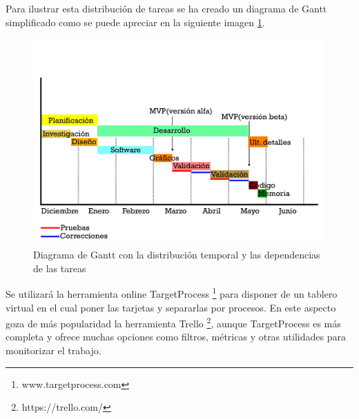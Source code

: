 Para ilustrar esta distribución de tareas se ha creado un diagrama de Gantt simplificado como se puede apreciar en la siguiente imagen \ref{gantt01}.

\begin{figure}
	\begin{center}
		\includegraphics[scale=0.6]{imagenes/GanttDiagram.jpg}
		\caption{Diagrama de Gantt con la distribución temporal y las dependencias de las tareas}
		\label{gantt01}
	\end{center}
\end{figure}

Se utilizará la herramienta online TargetProcess \footnote{www.targetprocess.com} para disponer de un tablero virtual  en el cual poner las tarjetas y separarlas por procesos. En este aspecto goza de más popularidad la herramienta Trello \footnote{https://trello.com/}, aunque TargetProcess es más completa y ofrece muchas opciones como filtros, métricas y otras utilidades para monitorizar el trabajo.


